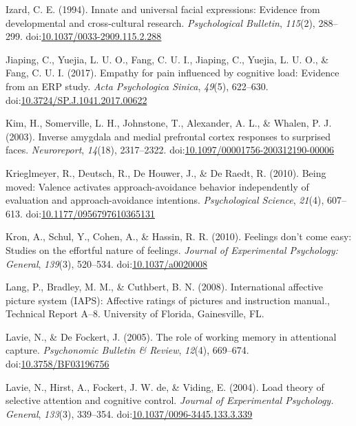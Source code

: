 \documentclass[man]{apa6}
\begin{document}
\leavevmode\hypertarget{ref-izard_innate_1994}{}%
Izard, C. E. (1994). Innate and universal facial expressions: Evidence from developmental and cross-cultural research. \emph{Psychological Bulletin}, \emph{115}(2), 288--299. doi:\href{https://doi.org/10.1037/0033-2909.115.2.288}{10.1037/0033-2909.115.2.288}

\leavevmode\hypertarget{ref-jiaping_empathy_2017}{}%
Jiaping, C., Yuejia, L. U. O., Fang, C. U. I., Jiaping, C., Yuejia, L. U. O., \& Fang, C. U. I. (2017). Empathy for pain influenced by cognitive load: Evidence from an ERP study. \emph{Acta Psychologica Sinica}, \emph{49}(5), 622--630. doi:\href{https://doi.org/10.3724/SP.J.1041.2017.00622}{10.3724/SP.J.1041.2017.00622}

\leavevmode\hypertarget{ref-kim_inverse_2003}{}%
Kim, H., Somerville, L. H., Johnstone, T., Alexander, A. L., \& Whalen, P. J. (2003). Inverse amygdala and medial prefrontal cortex responses to surprised faces. \emph{Neuroreport}, \emph{14}(18), 2317--2322. doi:\href{https://doi.org/10.1097/00001756-200312190-00006}{10.1097/00001756-200312190-00006}

\leavevmode\hypertarget{ref-krieglmeyer_being_2010}{}%
Krieglmeyer, R., Deutsch, R., De Houwer, J., \& De Raedt, R. (2010). Being moved: Valence activates approach-avoidance behavior independently of evaluation and approach-avoidance intentions. \emph{Psychological Science}, \emph{21}(4), 607--613. doi:\href{https://doi.org/10.1177/0956797610365131}{10.1177/0956797610365131}

\leavevmode\hypertarget{ref-kron_feelings_2010}{}%
Kron, A., Schul, Y., Cohen, A., \& Hassin, R. R. (2010). Feelings don't come easy: Studies on the effortful nature of feelings. \emph{Journal of Experimental Psychology: General}, \emph{139}(3), 520--534. doi:\href{https://doi.org/10.1037/a0020008}{10.1037/a0020008}

\leavevmode\hypertarget{ref-lang_international_2008}{}%
Lang, P., Bradley, M. M., \& Cuthbert, B. N. (2008). International affective picture system (IAPS): Affective ratings of pictures and instruction manual., Technical Report A--8. University of Florida, Gainesville, FL.

\leavevmode\hypertarget{ref-lavie_role_2005}{}%
Lavie, N., \& De Fockert, J. (2005). The role of working memory in attentional capture. \emph{Psychonomic Bulletin \& Review}, \emph{12}(4), 669--674. doi:\href{https://doi.org/10.3758/BF03196756}{10.3758/BF03196756}

\leavevmode\hypertarget{ref-lavie_load_2004}{}%
Lavie, N., Hirst, A., Fockert, J. W. de, \& Viding, E. (2004). Load theory of selective attention and cognitive control. \emph{Journal of Experimental Psychology. General}, \emph{133}(3), 339--354. doi:\href{https://doi.org/10.1037/0096-3445.133.3.339}{10.1037/0096-3445.133.3.339}
\end{document}
